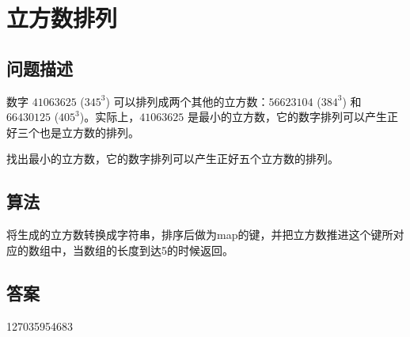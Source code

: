 \section{立方数排列}\label{sec:problem62}
\subsection{问题描述}
\begin{tcolorbox}
数字 \(41063625\) (\(345^3\)) 可以排列成两个其他的立方数：\(56623104\) (\(384^3\)) 和 \(66430125\) (\(405^3\))。实际上，\(41063625\) 是最小的立方数，它的数字排列可以产生正好三个也是立方数的排列。

找出最小的立方数，它的数字排列可以产生正好五个立方数的排列。
\end{tcolorbox}

\subsection{算法}
将生成的立方数转换成字符串，排序后做为map的键，并把立方数推进这个键所对应的数组中，当数组的长度到达5的时候返回。

\subsection{答案}
127035954683
